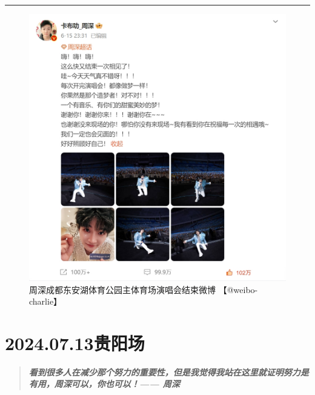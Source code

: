 \documentclass[]{ctexbook}
\begin{document}
\begin{center}\rule{0.5\linewidth}{0.5pt}\end{center}

\begin{figure}

{\centering \includegraphics{img/weibo/chengdu-20240615} 

}

\caption{周深成都东安湖体育公园主体育场演唱会结束微博 【@weibo-charlie】}\label{fig:unnamed-chunk-55}
\end{figure}

\chapter{2024.07.13贵阳场}\label{guiyang-20240713}

\begin{quote}
\textbf{\emph{看到很多人在减少那个努力的重要性，但是我觉得我站在这里就证明努力是有用，周深可以，你也可以！------ 周深}}
\end{quote}
\end{document}

